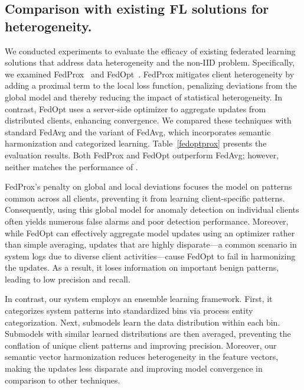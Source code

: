 \subsection{Comparison with existing FL solutions for heterogeneity.}
\label{sec:fedalternatives}

We conducted experiments to evaluate the efficacy of existing federated learning solutions that address data heterogeneity and the non-IID problem. Specifically, we examined FedProx~\cite{li2020federated} and FedOpt~\cite{asad2020fedopt}. FedProx mitigates client heterogeneity by adding a proximal term to the local loss function, penalizing deviations from the global model and thereby reducing the impact of statistical heterogeneity. In contrast, FedOpt uses a server-side optimizer to aggregate updates from distributed clients, enhancing convergence. We compared these techniques with standard FedAvg and the \Sys variant of FedAvg, which incorporates semantic harmonization and categorized learning. Table~\ref{fedoptprox} presents the evaluation results. Both FedProx and FedOpt outperform FedAvg; however, neither matches the performance of \Sys.

FedProx's penalty on global and local deviations focuses the model on patterns common across all clients, preventing it from learning client-specific patterns. Consequently, using this global model for anomaly detection on individual clients often yields numerous false alarms and poor detection performance. Moreover, while FedOpt can effectively aggregate model updates using an optimizer rather than simple averaging, updates that are highly disparate—a common scenario in system logs due to diverse client activities—cause FedOpt to fail in harmonizing the updates. As a result, it loses information on important benign patterns, leading to low precision and recall.

In contrast, our system employs an ensemble learning framework. First, it categorizes system patterns into standardized bins via process entity categorization. Next, \gnnshort submodels learn the data distribution within each bin. Submodels with similar learned distributions are then averaged, preventing the conflation of unique client patterns and improving precision. Moreover, our semantic vector harmonization reduces heterogeneity in the \gnnshort feature vectors, making the updates less disparate and improving model convergence in comparison to other techniques.
 

